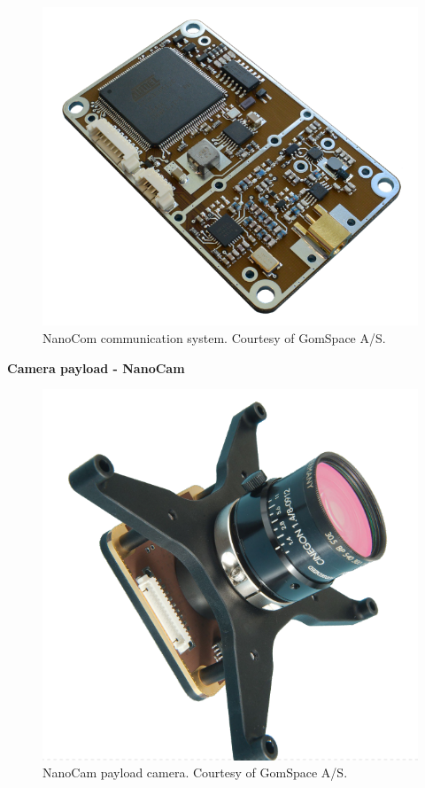 \documentclass[english,12pt,a4paper,pdftex,elec,utf8]{aaltothesis}
\begin{document}
\begin{figure}[h!]
\centering
\includegraphics[scale=0.2]{nanocomm_pcb}
\caption{NanoCom communication system. Courtesy of GomSpace A/S. \cite{nanocomds}}
\label{nanocom}
\end{figure} 
\textbf{Camera payload - NanoCam}\\
\begin{figure}[h!]
\centering
\includegraphics[scale=0.2]{nanocam}
\caption{NanoCam payload camera. Courtesy of GomSpace A/S. \cite{nanocamds}}
\label{nanocam}
\end{figure} 
\end{document}
